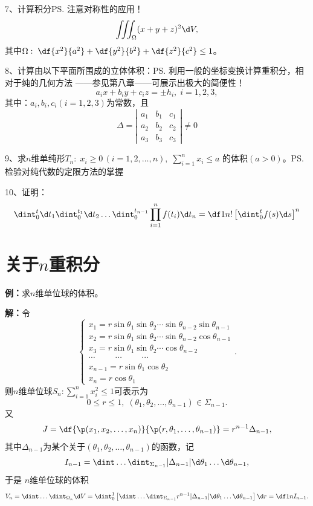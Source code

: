 7、计算积分\ps{注意对称性的应用！}
$$\iiint_{\Omega}(x+y+z)^2\d V,$$
其中$\Omega:\;\df{x^2}{a^2}+\df{y^2}{b^2}+\df{z^2}{c^2}\leq 1$。

8、计算由以下平面所围成的立体体积：\ps{利用一般的坐标变换计算重积分，相对于纯的几何方法
——参见第八章——可展示出极大的简便性！}
$$a_ix+b_iy+c_iz=\pm h_i,\;i=1,2,3,$$
其中：$a_i,b_i,c_i(i=1,2,3)$为常数，且
$$\Delta=\left|\begin{array}{ccc}
a_1 & b_1 & c_1\\ a_2 & b_2 & c_2 \\ a_3 & b_3 & c_3
\end{array}\right|\ne 0$$

9、求$n$维单纯形$T_n:\; x_i\geq 0\,(i=1,2,\ldots,n),\;
\sum\limits_{i=1}^nx_i\leq a$
的体积$(a>0)$。\ps{检验对纯代数的定限方法的掌握}

10、证明：
$$\dint_0^t\d t_1\dint_0^{t_1}\d t_2\ldots
\dint_0^{t_{n-1}}\prod\limits_{i=1}^nf(t_i)\d t_n
=\df 1{n!}\left[\dint_0^tf(s)\d s\right]^n$$

\ifvisible

\newpage

\section*{关于$n$重积分}

{\bf 例：}求$n$维单位球的体积。

{\bf 解：}令
$$
\left\{
\begin{array}{l}
x_1=r\sin\theta_1\sin\theta_2\cdots\sin\theta_{n-2}\sin\theta_{n-1}\\
x_2=r\sin\theta_1\sin\theta_2\cdots\sin\theta_{n-2}\cos\theta_{n-1}\\
x_3=r\sin\theta_1\sin\theta_2\cdots\cos\theta_{n-2}\\
\cdots\hspace{1cm}\cdots\hspace{1cm}\cdots\\
x_{n-1}=r\sin\theta_1\cos\theta_2\\
x_n=r\cos\theta_1
\end{array}
\right..
$$
则$n$维单位球$S_n:\sum\limits_{i=1}^nx^2_i\leq1$可表示为
$$0\leq r\leq 1,\;(\theta_1,\theta_2,\ldots,\theta_{n-1})\in\Sigma_{n-1}.$$
又
$$J=\df{\p(x_1,x_2,\ldots,x_n)}{\p(r,\theta_1,\ldots,\theta_{n-1})}
=r^{n-1}\Delta_{n-1},$$
其中$\Delta_{n-1}$为某个关于$(\theta_1,\theta_2,\ldots,\theta_{n-1})$的函数，记
$$I_{n-1}=\dint\ldots\dint_{\Sigma_{n-1}}|\Delta_{n-1}|
\d\theta_1\ldots\d\theta_{n-1},$$
于是
$n$维单位球的体积
$$V_n=\dint\ldots\dint_{\Omega_n}\d V
=\dint_0^1\left[\dint\ldots\dint_{\Sigma_{n-1}}r^{n-1}|\Delta_{n-1}|
\d\theta_1\ldots\d\theta_{n-1}\right]\d r=\df1nI_{n-1}.$$


